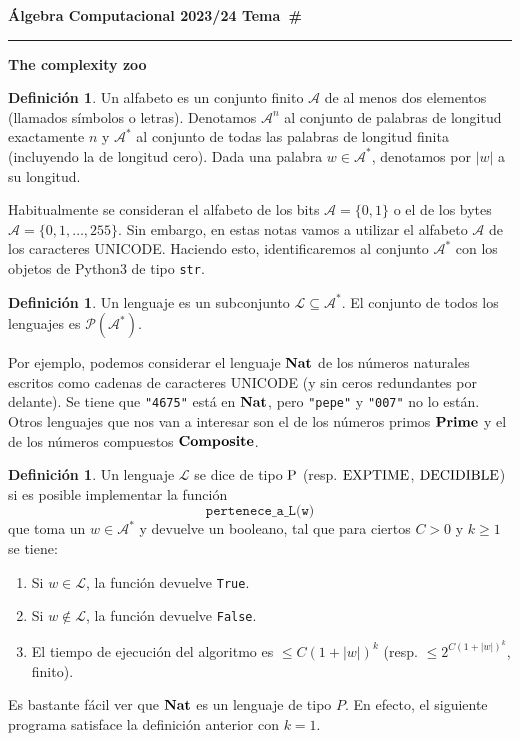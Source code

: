 \documentclass[a4paper, 11pt]{article}
\newcommand{\Alf}{\mathcal{A}}
\newcommand{\Lan}{\mathcal{L}}
\newcounter{numerodetema}
\newcommand\tema[1]{{\eject\stepcounter{numerodetema}\bf Álgebra Computacional
2023/24 \hfill Tema~\#\arabic{numerodetema}}\par\smallskip\hrule\bigskip\par
\begin{center}{\Large\bf #1}\end{center}}
\theoremstyle{plain}
\theoremstyle{definition}
\newtheorem{defi}[teor]{Definición}
\begin{document}
\setcounter{numerodetema}{5}
\tema{The complexity zoo}

\begin{defi}
Un alfabeto es un conjunto finito $\Alf$ de al menos dos elementos (llamados símbolos
o letras). Denotamos $\Alf^n$ al conjunto de palabras de longitud exactamente $n$ y
$\Alf^*$ al conjunto de todas las palabras de longitud finita (incluyendo la de
longitud cero). Dada una palabra $w\in\Alf^*$, denotamos por $|w|$ a su longitud.
\end{defi}

Habitualmente se consideran el alfabeto de los bits $\Alf=\{0,1\}$ o el de los bytes
$\Alf=\{0,1,\ldots,255\}$. Sin embargo, en estas notas vamos a utilizar el alfabeto
$\Alf$ de los caracteres UNICODE. Haciendo esto, identificaremos al conjunto $\Alf^*$
con los objetos de Python3 de tipo \texttt{str}.

\begin{defi}
Un lenguaje es un subconjunto $\Lan\subseteq\Alf^*$. El conjunto de todos los lenguajes
es $\mathcal{P}(\Alf^*)$.
\end{defi}

Por ejemplo, podemos considerar el lenguaje ${\bf Nat}$ de los números naturales
escritos como cadenas de caracteres UNICODE (y sin ceros redundantes por delante).
Se tiene que \texttt{"4675"} está en ${\bf Nat}$, pero \texttt{"pepe"} y \texttt{"007"}
no lo están. Otros lenguajes que nos van a interesar son el de los números primos
${\bf Prime}$ y el de los números compuestos ${\bf Composite}$.

\begin{defi}\label{defP}
Un lenguaje $\Lan$ se dice de tipo ${\rm P}$ (resp. ${\rm EXPTIME}$, ${\rm DECIDIBLE}$)
si es posible implementar la función
\[
   \texttt{pertenece\_a\_L(w)}
\]
que toma un $w\in\Alf^*$ y devuelve un booleano, tal que para ciertos $C>0$ y $k\geq 1$
se tiene:
\begin{enumerate}
\item Si $w\in\Lan$, la función devuelve \texttt{True}.
\item Si $w\not\in\Lan$, la función devuelve \texttt{False}.
\item El tiempo de ejecución del algoritmo es $\leq C(1+|w|)^k$ (resp.
$\leq 2^{C(1+|w|)^k}$, finito).
\end{enumerate}
\end{defi}

\bigskip

Es bastante fácil ver que ${\bf Nat}$ es un lenguaje de tipo $P$. En efecto, el
siguiente programa satisface la definición anterior con $k=1$.
\end{document}
